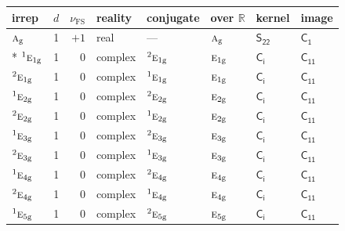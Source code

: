 \documentclass[10pt,a4paper]{article}
\numberwithin{equation}{section}
\newcommand{\grp}[1]{\mathsf{#1}}
\newcommand{\irr}[1]{\text{\normalfont\scshape #1}}
\newcommand{\conjpair}[1]{{}^{#1}}
\newcommand{\ptag}[1]{\mathrm{#1}}
\newcommand{\fsind}{\nu_{\mathrm{FS}}}
\begin{document}
{\small\renewcommand{\arraystretch}{1.25}\setlength{\tabcolsep}{4pt}\begin{longtable}{@{}lrrlllll@{}}\toprule
irrep & $d$ & $\fsind$ & reality & conjugate & over $\mathbb{R}$ & kernel & image\\\midrule\endhead
\bottomrule\endfoot\endlastfoot
$\irr{a}_{\ptag{g}}$ & 1 & $+1$ & real & --- & $\irr{a}_{\ptag{g}}$ & \href{S22.pdf}{$\grp{S_{22}}$} & \href{../../../rotation/data/pdf/C1.pdf}{$\grp{C_{1}}$}\\*
$\conjpair{1}\irr{e}_{1\ptag{g}}$ & 1 & $0$ & complex & $\conjpair{2}\irr{e}_{1\ptag{g}}$ & $\irr{e}_{1\ptag{g}}$ & \href{S2.pdf}{$\grp{C_{i}}$} & \href{../../../rotation/data/pdf/C11.pdf}{$\grp{C_{11}}$}\\
$\conjpair{2}\irr{e}_{1\ptag{g}}$ & 1 & $0$ & complex & $\conjpair{1}\irr{e}_{1\ptag{g}}$ & $\irr{e}_{1\ptag{g}}$ & \href{S2.pdf}{$\grp{C_{i}}$} & \href{../../../rotation/data/pdf/C11.pdf}{$\grp{C_{11}}$}\\
$\conjpair{1}\irr{e}_{2\ptag{g}}$ & 1 & $0$ & complex & $\conjpair{2}\irr{e}_{2\ptag{g}}$ & $\irr{e}_{2\ptag{g}}$ & \href{S2.pdf}{$\grp{C_{i}}$} & \href{../../../rotation/data/pdf/C11.pdf}{$\grp{C_{11}}$}\\
$\conjpair{2}\irr{e}_{2\ptag{g}}$ & 1 & $0$ & complex & $\conjpair{1}\irr{e}_{2\ptag{g}}$ & $\irr{e}_{2\ptag{g}}$ & \href{S2.pdf}{$\grp{C_{i}}$} & \href{../../../rotation/data/pdf/C11.pdf}{$\grp{C_{11}}$}\\
$\conjpair{1}\irr{e}_{3\ptag{g}}$ & 1 & $0$ & complex & $\conjpair{2}\irr{e}_{3\ptag{g}}$ & $\irr{e}_{3\ptag{g}}$ & \href{S2.pdf}{$\grp{C_{i}}$} & \href{../../../rotation/data/pdf/C11.pdf}{$\grp{C_{11}}$}\\
$\conjpair{2}\irr{e}_{3\ptag{g}}$ & 1 & $0$ & complex & $\conjpair{1}\irr{e}_{3\ptag{g}}$ & $\irr{e}_{3\ptag{g}}$ & \href{S2.pdf}{$\grp{C_{i}}$} & \href{../../../rotation/data/pdf/C11.pdf}{$\grp{C_{11}}$}\\
$\conjpair{1}\irr{e}_{4\ptag{g}}$ & 1 & $0$ & complex & $\conjpair{2}\irr{e}_{4\ptag{g}}$ & $\irr{e}_{4\ptag{g}}$ & \href{S2.pdf}{$\grp{C_{i}}$} & \href{../../../rotation/data/pdf/C11.pdf}{$\grp{C_{11}}$}\\
$\conjpair{2}\irr{e}_{4\ptag{g}}$ & 1 & $0$ & complex & $\conjpair{1}\irr{e}_{4\ptag{g}}$ & $\irr{e}_{4\ptag{g}}$ & \href{S2.pdf}{$\grp{C_{i}}$} & \href{../../../rotation/data/pdf/C11.pdf}{$\grp{C_{11}}$}\\
$\conjpair{1}\irr{e}_{5\ptag{g}}$ & 1 & $0$ & complex & $\conjpair{2}\irr{e}_{5\ptag{g}}$ & $\irr{e}_{5\ptag{g}}$ & \href{S2.pdf}{$\grp{C_{i}}$} & \href{../../../rotation/data/pdf/C11.pdf}{$\grp{C_{11}}$}\\

\end{longtable}}
\end{document}

